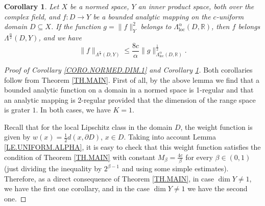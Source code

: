 \documentclass{amsart}
\newtheorem{corollary}[theorem]{Corollary}
\theoremstyle{definition}
\numberwithin{equation}{section}
\begin{document}
\begin{corollary}\label{CORO.NORMED.DIM,N>1}
Let $X$ be a normed space, $Y$ an inner product space, both over the complex field, and $f:D\to Y$ be a bounded analytic
mapping on the $c$-uniform domain $D\subseteq X$. If the function $g = \|f\|_Y^2$ belongs to
$\Lambda^{\alpha}_{\mathrm{loc}}(D,\mathbb{R})$, then $f$ belongs  $\Lambda^{\frac{\alpha}2}(D,Y)$, and we have
\begin{equation*}
\|f\|_{\Lambda^{\frac{\alpha}2}(D,Y)} 
\le\frac{8c}\alpha\|g\|_{\Lambda^{{\alpha}}_{\mathrm {loc}}(D,\mathbb{R})}^{\frac 12}.
\end{equation*}
\end{corollary}

\begin{proof}[Proof of Corollary \ref{CORO.NORMED.DIM.1} and Corollary \ref{CORO.NORMED.DIM,N>1}]
Both corollaries follow from Theorem \ref{TH.MAIN}. First of all, by the above lemma we find that a bounded analytic
function on a domain in a normed space is 1-regular and that an analytic mapping is 2-regular provided that the
dimension of the range space is grater $1$. In both cases, we have $K = 1$.

Recall that for the local Lipschitz class in the domain $D$, the weight function is given by
$w(x) = \frac 12 d(x, \partial D)$, $x\in D$. Taking into account Lemma \ref{LE.UNIFORM.ALPHA}, it is easy to check
that this weight function satisfies the condition of Theorem \ref{TH.MAIN} with constant
$M_\beta = \frac {4c}{\beta}$ for every $\beta\in (0,1)$ (just dividing the inequality by $2^{\beta-1}$ and using
some simple estimates). Therefore, as a direct consequence of Theorem \ref{TH.MAIN}, in case $\dim Y \not =  1$, we
have the first one corollary, and in the case $\dim Y \not = 1$ we have the second one.
\end{proof}
\end{document}

